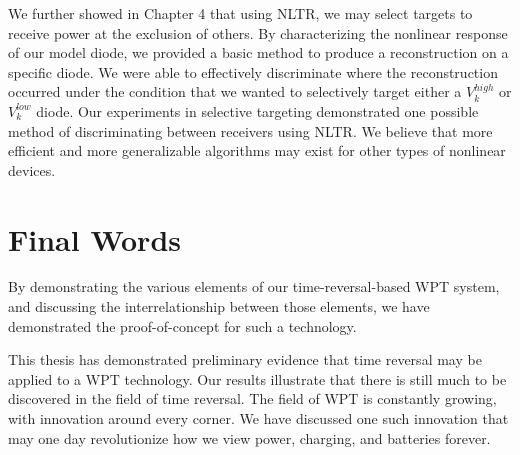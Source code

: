 We further showed in Chapter 4 that using NLTR, we may select targets to receive power at the exclusion of others. By characterizing the nonlinear response of our model diode, we provided a basic method to produce a reconstruction on a specific diode. We were able to effectively discriminate where the reconstruction occurred under the condition that we wanted to selectively target either a $V_{k}^{high}$ or $V_{k}^{low}$ diode. Our experiments in selective targeting demonstrated one possible method of discriminating between receivers using NLTR. We believe that more efficient and more generalizable algorithms may exist for other types of nonlinear devices.

\section{Final Words}

By demonstrating the various elements of our time-reversal-based WPT system, and discussing the interrelationship between those elements, we have demonstrated the proof-of-concept for such a technology.

This thesis has demonstrated preliminary evidence that time reversal may be applied to a WPT technology. Our results illustrate that there is still much to be discovered in the field of time reversal. The field of WPT is constantly growing, with innovation around every corner. We have discussed one such innovation that may one day revolutionize how we view power, charging, and batteries forever.

